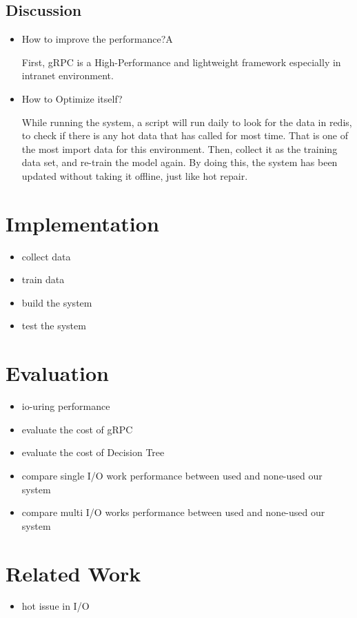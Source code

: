 \documentclass[conference]{IEEEtran}
\begin{document}
\subsection{Discussion}
\begin{itemize}
    \item How to improve the performance?A
    
    First, gRPC is a High-Performance and lightweight framework especially in intranet environment. 

    \item How to Optimize itself?

    While running the system, a script will run daily to look for the data in redis, to check if there is any hot data that has called for most time. 
    That is one of the most import data for this environment. Then, collect it as the training data set, and re-train the model again.
    By doing this, the system has been updated without taking it offline, just like hot repair.

\end{itemize}


\section{Implementation}
\begin{itemize}
    \item collect data
    \item train data
    \item build the system
    \item test the system
\end{itemize}


\section{Evaluation}
\begin{itemize}
    \item io-uring performance
    \item evaluate the cost of gRPC
    \item evaluate the cost of Decision Tree
    \item compare single I/O work performance between used and none-used our system 
    \item compare multi I/O works performance between used and none-used our system 
\end{itemize}

\section{Related Work}
\begin{itemize}
    \item hot issue in I/O
\end{itemize}
\end{document}
